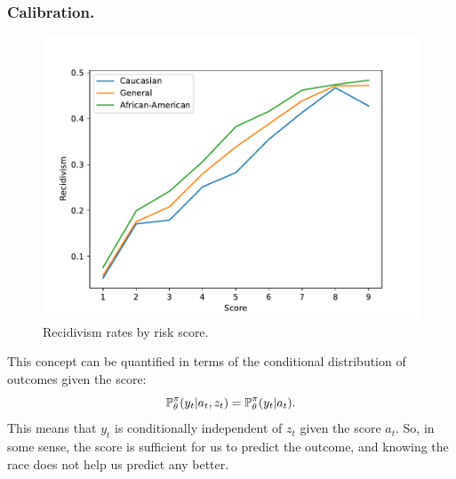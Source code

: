 \begin{frame}
  \frametitle{Calibration.}
  
  \begin{figure}[H]
    \centering
    \includegraphics[width=\columnwidth]{../figures/calibration-compas}
    \caption{Recidivism rates by risk score.}
    \label{fig:imrs}
  \end{figure}
  This concept can be quantified in terms of the conditional distribution of outcomes given the score:
  \begin{equation}
    \mathop{\mbox{\ensuremath{\mathbb{P}}}}\nolimits_\theta^\pi(y_t | a_t, z_t) =       \mathop{\mbox{\ensuremath{\mathbb{P}}}}\nolimits_\theta^\pi(y_t | a_t).
    \label{eq:calibration}
  \end{equation}
  This means that $y_t$ is conditionally independent of $z_t$ given
  the score $a_t$. So, in some sense, the score is sufficient for us
  to predict the outcome, and knowing the race does not help us
  predict any better.  
\end{frame}

